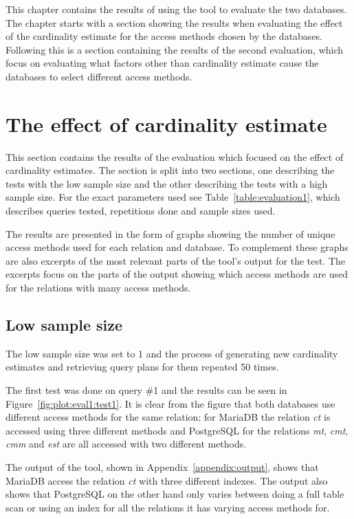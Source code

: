 This chapter contains the results of using the tool to evaluate the two
databases. The chapter starts with a section showing the results when
evaluating the effect of the cardinality estimate for the access methods chosen
by the databases. Following this is a section containing the results of the
second evaluation, which focus on evaluating what factors other than cardinality
estimate cause the databases to select different access methods.

\section{The effect of cardinality estimate}\label{sec:correlation}
This section contains the results of the evaluation which focused on the effect of
cardinality estimates. The section is split into two sections, one describing
the tests with the low sample size and the other describing the tests with a
high sample size. For the exact parameters used see
Table~\ref{table:evaluation1}, which describes queries tested, repetitions done
and sample sizes used.

The results are presented in the form of graphs showing the number of unique
access methods used for each relation and database. To complement these graphs
are also excerpts of the most relevant parts of the tool's output for the test.
The excerpts focus on the parts of the output showing which access methods are
used for the relations with many access methods.

\subsection{Low sample size}
The low sample size was set to 1 and the process of generating new cardinality
estimates and retrieving query plans for them repeated 50 times.

The first test was done on query \#1 and the results can be seen in
Figure~\ref{fig:plot:eval1:test1}. It is clear from the figure that both
databases use different access methods for the same relation; for MariaDB the
relation \textit{ct} is accessed using three different methods and PostgreSQL
for the relations \textit{mt}, \textit{cmt}, \textit{cmm} and \textit{est} are
all accessed with two different methods.

The output of the tool, shown in Appendix~\ref{appendix:output}, shows that
MariaDB access the relation \textit{ct} with three different indexes. The
output also shows that PostgreSQL on the other hand only varies between doing a
full table scan or using an index for all the relations it has varying access
methods for.

